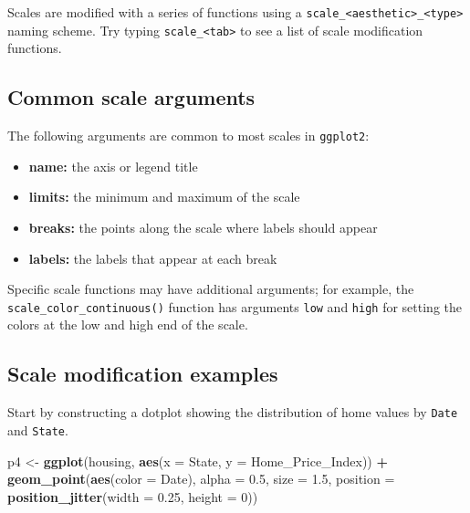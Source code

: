 \documentclass[
]{book}
\newenvironment{Shaded}{\begin{snugshade}}{\end{snugshade}}
\newcommand{\DataTypeTok}[1]{\textcolor[rgb]{0.13,0.29,0.53}{#1}}
\newcommand{\DecValTok}[1]{\textcolor[rgb]{0.00,0.00,0.81}{#1}}
\newcommand{\FloatTok}[1]{\textcolor[rgb]{0.00,0.00,0.81}{#1}}
\newcommand{\KeywordTok}[1]{\textcolor[rgb]{0.13,0.29,0.53}{\textbf{#1}}}
\newcommand{\NormalTok}[1]{#1}
\newcommand{\OperatorTok}[1]{\textcolor[rgb]{0.81,0.36,0.00}{\textbf{#1}}}
\newcommand{\StringTok}[1]{\textcolor[rgb]{0.31,0.60,0.02}{#1}}
\providecommand{\tightlist}{%
  \setlength{\itemsep}{0pt}\setlength{\parskip}{0pt}}
\begin{document}
Scales are modified with a series of functions using a \texttt{scale\_\textless{}aesthetic\textgreater{}\_\textless{}type\textgreater{}} naming scheme. Try typing \texttt{scale\_\textless{}tab\textgreater{}} to see a list of scale modification functions.

\hypertarget{common-scale-arguments}{%
\subsection{Common scale arguments}\label{common-scale-arguments}}

The following arguments are common to most scales in \texttt{ggplot2}:

\begin{itemize}
\tightlist
\item
  \textbf{name:} the axis or legend title
\item
  \textbf{limits:} the minimum and maximum of the scale
\item
  \textbf{breaks:} the points along the scale where labels should appear
\item
  \textbf{labels:} the labels that appear at each break
\end{itemize}

Specific scale functions may have additional arguments; for example, the \texttt{scale\_color\_continuous()} function has arguments \texttt{low} and \texttt{high} for setting the colors at the low and high end of the scale.

\hypertarget{scale-modification-examples}{%
\subsection{Scale modification examples}\label{scale-modification-examples}}

Start by constructing a dotplot showing the distribution of home values by \texttt{Date} and \texttt{State}.

\begin{Shaded}
\begin{Highlighting}[]
\NormalTok{p4 <-}\StringTok{ }\KeywordTok{ggplot}\NormalTok{(housing, }\KeywordTok{aes}\NormalTok{(}\DataTypeTok{x =}\NormalTok{ State, }\DataTypeTok{y =}\NormalTok{ Home_Price_Index)) }\OperatorTok{+}\StringTok{ }
\StringTok{    }\KeywordTok{geom_point}\NormalTok{(}\KeywordTok{aes}\NormalTok{(}\DataTypeTok{color =}\NormalTok{ Date), }\DataTypeTok{alpha =} \FloatTok{0.5}\NormalTok{, }\DataTypeTok{size =} \FloatTok{1.5}\NormalTok{,}
               \DataTypeTok{position =} \KeywordTok{position_jitter}\NormalTok{(}\DataTypeTok{width =} \FloatTok{0.25}\NormalTok{, }\DataTypeTok{height =} \DecValTok{0}\NormalTok{))}
\end{Highlighting}
\end{Shaded}
\end{document}
